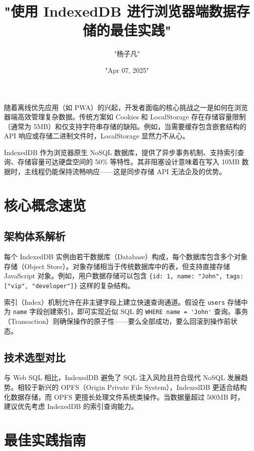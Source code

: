 \title{"使用 IndexedDB 进行浏览器端数据存储的最佳实践"}
\author{"杨子凡"}
\date{"Apr 07, 2025"}
\maketitle
随着离线优先应用（如 PWA）的兴起，开发者面临的核心挑战之一是如何在浏览器端高效管理复杂数据。传统方案如 Cookies 和 LocalStorage 存在存储容量限制（通常为 5MB）和仅支持字符串存储的缺陷。例如，当需要缓存包含嵌套结构的 API 响应或存储二进制文件时，LocalStorage 显然力不从心。\par
IndexedDB 作为浏览器原生 NoSQL 数据库，提供了异步事务机制、支持索引查询、存储容量可达硬盘空间的 50\%{} 等特性。其非阻塞设计意味着在写入 10MB 数据时，主线程仍能保持流畅响应——这是同步存储 API 无法企及的优势。\par
\chapter{核心概念速览}
\section{架构体系解析}
每个 IndexedDB 实例由若干数据库（Database）构成，每个数据库包含多个对象存储（Object Store）。对象存储相当于传统数据库中的表，但支持直接存储 JavaScript 对象。例如，用户数据存储可以包含 \verb!{id: 1, name: "John", tags: ["vip", "developer"]}! 这样的复杂结构。\par
索引（Index）机制允许在非主键字段上建立快速查询通道。假设在 \verb!users! 存储中为 \verb!name! 字段创建索引，即可实现近似 SQL 的 \verb!WHERE name = 'John'! 查询。事务（Transaction）则确保操作的原子性——要么全部成功，要么回滚到操作前状态。\par
\section{技术选型对比}
与 Web SQL 相比，IndexedDB 避免了 SQL 注入风险且符合现代 NoSQL 发展趋势。相较于新兴的 OPFS（Origin Private File System），IndexedDB 更适合结构化数据存储，而 OPFS 更擅长处理文件系统类操作。当数据量超过 500MB 时，建议优先考虑 IndexedDB 的索引查询能力。\par
\chapter{最佳实践指南}
